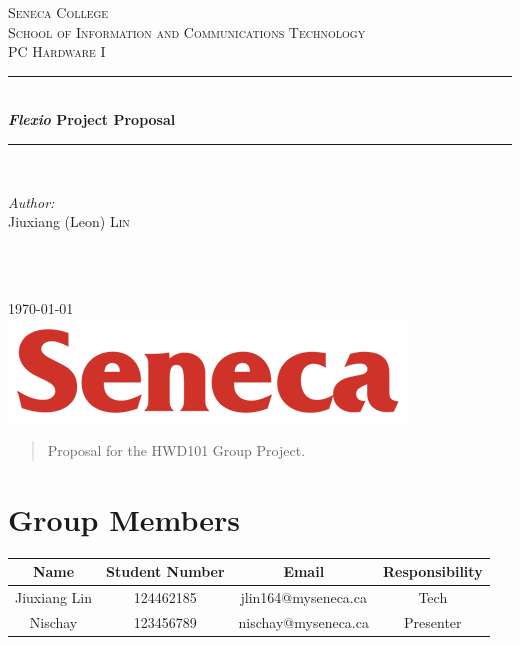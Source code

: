 \documentclass[12pt]{article}
\begin{document}
\begin{titlepage}

\newcommand{\HRule}{\rule{\linewidth}{0.5mm}}
\center
 
\textsc{\LARGE Seneca College}\\[1.5cm]
\textsc{\Large School of Information and Communications Technology}\\[0.5cm]
\textsc{\large PC Hardware I}\\[0.5cm]

\HRule \\[0.4cm]
{ \huge \bfseries \textit{Flexio} Project Proposal}\\[0.4cm]
\HRule \\[1.5cm]
 
\begin{minipage}{0.4\textwidth}
\begin{flushleft} \large
\emph{Author:}\\
Jiuxiang (Leon) \textsc{Lin}
\end{flushleft}
\end{minipage}
~
\begin{minipage}{0.4\textwidth}
\begin{flushright} \large
\end{flushright}
\end{minipage}\\[2cm]

{\large \today}\\[2cm]

\includegraphics{logo.png}\\[1cm]

\vfill

\end{titlepage}


\begin{abstract}
Proposal for the HWD101 Group Project.	
\end{abstract}

\section{Group Members}

\begin{tabular}{| c | c | c | c |}
\hline
\textbf{Name} & \textbf{Student Number} & \textbf{Email} & \textbf{Responsibility} \\\hline
Jiuxiang Lin & 124462185 & jlin164@myseneca.ca & Tech \\\hline
Nischay & 123456789 & nischay@myseneca.ca & Presenter \\\hline
\end{tabular}
\end{document}
